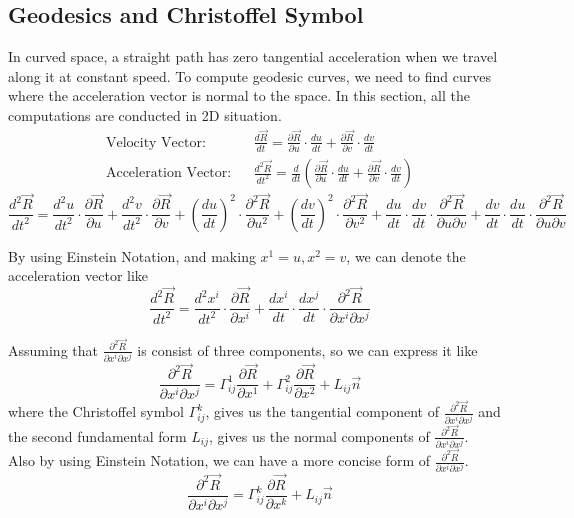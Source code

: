 \documentclass{article}
\theoremstyle{definition}
\theoremstyle{plain}
\begin{document}
\subsection{Geodesics and Christoffel Symbol}
In curved space, a straight path has zero tangential acceleration when we travel along it at constant speed. To compute geodesic curves, we need to find curves where the acceleration vector is normal to the space.
In this section, all the computations are conducted in 2D situation.
\begin{align}
    \text{Velocity Vector:}&&\frac{d\vec{R}}{dt}=\frac{\partial\vec{R}}{\partial u}\cdot\frac{du}{dt}+\frac{\partial\vec{R}}{\partial v}\cdot\frac{dv}{dt}\\
    \text{Acceleration Vector:}&&\frac{d^2\vec{R}}{dt^2}=\frac{d}{dt}\left(\frac{\partial\vec{R}}{\partial u}\cdot\frac{du}{dt}+\frac{\partial\vec{R}}{\partial v}\cdot\frac{dv}{dt}\right)
\end{align}
\begin{equation}
    \frac{d^2\vec{R}}{d t^2}=\frac{d^2 u}{d t^2}\cdot\frac{\partial \vec{R}}{\partial u}+\frac{d^2 v}{d t^2}\cdot\frac{\partial \vec{R}}{\partial v}+\left(\frac{du}{dt}\right)^2\cdot\frac{\partial^2\vec{R}}{\partial u^2}+\left(\frac{dv}{dt}\right)^2\cdot\frac{\partial^2\vec{R}}{\partial v^2}+\frac{du}{dt}\cdot\frac{dv}{dt}\cdot\frac{\partial^2\vec{R}}{\partial u\partial v}+\frac{dv}{dt}\cdot\frac{du}{dt}\cdot\frac{\partial^2\vec{R}}{\partial u\partial v}
\end{equation}

By using Einstein Notation, and making $x^1=u, x^2=v$, we can denote the acceleration vector like 
\begin{equation}
    \frac{d^2\vec{R}}{d t^2}=\frac{d^2 x^i}{d t^2}\cdot\frac{\partial \vec{R}}{\partial x^i}+\frac{dx^i}{dt}\cdot\frac{dx^j}{dt}\cdot\frac{\partial^2\vec{R}}{\partial x^i\partial x^j}
\end{equation}

Assuming that $\frac{\partial^2\vec{R}}{\partial x^i\partial x^j}$ is consist of three components, so we can express it like
\begin{equation}
    \frac{\partial^2\vec{R}}{\partial x^i\partial x^j}=\Gamma_{ij}^1\frac{\partial \vec{R}}{\partial x^1}+\Gamma_{ij}^2\frac{\partial \vec{R}}{\partial x^2}+L_{ij}\vec{n}
\end{equation}
where the Christoffel symbol $\Gamma_{ij}^k$, gives us the tangential component of $\frac{\partial^2\vec{R}}{\partial x^i\partial x^j}$ and the second fundamental form $L_{ij}$, gives us the normal components of $\frac{\partial^2\vec{R}}{\partial x^i \partial x^j}$.\\
Also by using Einstein Notation, we can have a more concise form of $\frac{\partial^2\vec{R}}{\partial x^i\partial x^j}$.
\begin{equation}
    \frac{\partial^2\vec{R}}{\partial x^i\partial x^j}=\Gamma_{ij}^k\frac{\partial \vec{R}}{\partial x^k}+L_{ij}\vec{n}
\end{equation}
\end{document}
